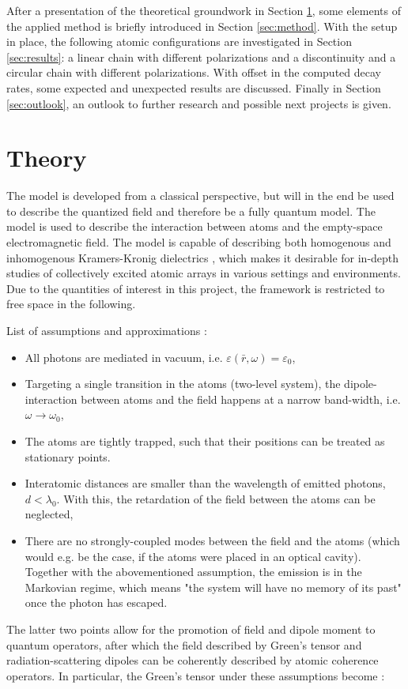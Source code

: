 \documentclass{article}
\begin{document}
After a presentation of the theoretical groundwork in Section \ref{sec:theory}, some elements of the applied method is briefly introduced in Section \ref{sec:method}. With the setup in place, the following atomic configurations are investigated in Section \ref{sec:results}: a linear chain with different polarizations and a discontinuity and a circular chain with different polarizations. With offset in the computed decay rates, some expected and unexpected results are discussed. Finally in Section \ref{sec:outlook}, an outlook to further research and possible next projects is given. 

\section{Theory}\label{sec:theory}

\noindent
The model is developed from a classical perspective, but will in the end be used to describe the quantized field and therefore be a fully quantum model. The model is used to describe the interaction between atoms and the empty-space electromagnetic field. The model is capable of describing both homogenous and inhomogenous Kramers-Kronig dielectrics \cite{Gruner}, which makes it desirable for in-depth studies of collectively excited atomic arrays in various settings and environments. Due to the quantities of interest in this project, the framework is restricted to free space in the following. 

List of assumptions and approximations \cite{Asenjo}:
\begin{itemize}\label{list:assumptions}
    \item All photons are mediated in vacuum, i.e. $\varepsilon(\bar{r},\omega) = \varepsilon_0$,
    \item Targeting a single transition in the atoms (two-level system), the dipole-interaction between atoms and the field happens at a narrow band-width, i.e. $\omega \rightarrow \omega_0$,
    \item The atoms are tightly trapped, such that their positions can be treated as stationary points. 
    \item Interatomic distances are smaller than the wavelength of emitted photons, $d < \lambda_0$. With this, the retardation of the field between the atoms can be neglected, 
    \item There are no strongly-coupled modes between the field and the atoms (which would e.g. be the case, if the atoms were placed in an optical cavity). Together with the abovementioned assumption, the emission is in the Markovian regime, which means "the system will have no memory of its past" \cite{Deutsch} once the photon has escaped. 
\end{itemize}
The latter two points allow for the promotion of field and dipole moment to quantum operators, after which the field described by Green's tensor and radiation-scattering dipoles can be coherently described by atomic coherence operators. In particular, the Green's tensor under these assumptions become \cite[Equation 6]{Asenjo}:
\end{document}
